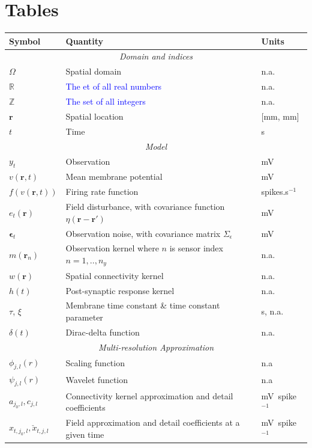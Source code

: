 \documentclass[review,authoryear,3p]{elsarticle}
\newcommand{\parham}[1]{\textcolor{blue}{#1}}
\begin{document}
\section*{Tables}
 \singlespacing
\begin{table}[!t]
\begin{tabular}{|l|l|l|}
	\hline
	\textbf{Symbol} & \textbf{Quantity} & \textbf{Units}\\
	\hline
	\multicolumn{3}{|c|}{\emph{Domain and indices}}\\
	\hline
	$\Omega$ & Spatial domain & n.a.\\ 
	$\mathbb{R}$&\parham{The et of all real numbers}&n.a.\\
	$\mathbb{Z}$&\parham{The set of all integers}&n.a.\\
	$\mathbf{r}$ & Spatial location & [mm, mm]\\
	$t$ & Time & s\\
	\hline
	\multicolumn{3}{|c|}{\emph{Model}}\\
	\hline
    $y_t$ & Observation & mV\\
    $v(\mathbf{r},t)$ & Mean membrane potential & mV \\
	$f(v\left(\mathbf{r},t\right))$ & Firing rate function & spikes.s$^{-1}$\\
	$e_t(\mathbf{r})$ & Field disturbance, with covariance function $\eta(\mathbf r-\mathbf r')$ & mV\\
	$\boldsymbol\epsilon_t$ & Observation noise, with covariance matrix $\Sigma_\epsilon$ & mV\\
	$m(\mathbf{r}_n)$ & Observation kernel where $n$ is sensor index $n=1,..,n_y$ & n.a. \\
	$w(\mathbf{r})$ & Spatial connectivity kernel & n.a.\\
	$h(t)$ & Post-synaptic response kernel & n.a.\\
	$\tau$, $\xi$ & Membrane time constant \& time constant parameter & s, n.a.\\
	$\delta(t)$ & Dirac-delta function & n.a.\\
	\hline    
	\multicolumn{3}{|c|}{\emph{Multi-resolution Approximation}} \\
	\hline                                                   
	$\phi_{j,l}(r)$&Scaling function&n.a\\
	$\psi_{j,l}(r)$&Wavelet function&n.a\\  
	$a_{j_0,l}, c_{j,l}$&Connectivity kernel approximation and detail coefficients&mV~spike$^{-1}$\\ 
	$x_{t,j_{0},l},\check{x}_{t,j,l}$&Field approximation and detail coefficients at a given time&mV~spike$^{-1}$\\ 

\end{tabular}
\end{table}
\end{document}

